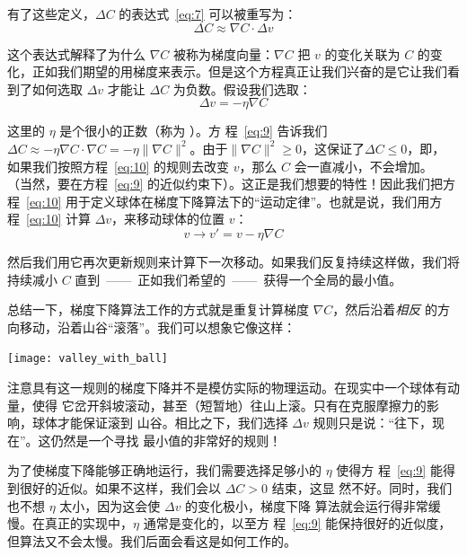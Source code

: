 有了这些定义，$\Delta C$ 的表达式~\eqref{eq:7} 可以被重写为：
\begin{equation}
  \Delta C \approx \nabla C \cdot \Delta v
  \label{eq:9}\tag{9}
\end{equation}

这个表达式解释了为什么 $\nabla C$ 被称为梯度向量：$\nabla C$ 把 $v$ 的变化关联为
$C$ 的变化，正如我们期望的用梯度来表示。但是这个方程真正让我们兴奋的是它让我们看
到了如何选取 $\Delta v$ 才能让 $\Delta C$ 为负数。假设我们选取：
\begin{equation}
  \Delta v = -\eta \nabla C
  \label{eq:10}\tag{10}
\end{equation}

这里的 $\eta$ 是个很小的正数（称为%
  \emph{\learningrate}\index{\learningrate}）。方
程~\eqref{eq:9} 告诉我们$\Delta C \approx -\eta \nabla C \cdot \nabla C = -\eta
\|\nabla C\|^2$。由于$\| \nabla C \|^2 \geq 0$，这保证了$\Delta C \leq 0$，即，
如果我们按照方程~\eqref{eq:10} 的规则去改变 $v$，那么 $C$ 会一直减小，不会增加。
（当然，要在方程~\eqref{eq:9} 的近似约束下）。这正是我们想要的特性！因此我们把方
程~\eqref{eq:10} 用于定义球体在梯度下降算法下的“运动定律”。也就是说，我们用方
程~\eqref{eq:10} 计算 $\Delta v$，来移动球体的位置 $v$：
\begin{equation}
  v \rightarrow v' = v -\eta \nabla C
  \label{eq:11}\tag{11}
\end{equation}

然后我们用它再次更新规则来计算下一次移动。如果我们反复持续这样做，我们将持续减小
$C$ 直到~——~正如我们希望的~——~获得一个全局的最小值。

总结一下，梯度下降算法工作的方式就是重复计算梯度 $\nabla C$，然后沿着\emph{相反}
的方向移动，沿着山谷“滚落”。我们可以想象它像这样：
\begin{center}
  \texttt{[image: valley\_with\_ball]}
\end{center}

注意具有这一规则的梯度下降并不是模仿实际的物理运动。在现实中一个球体有动量，使得
它岔开斜坡滚动，甚至（短暂地）往山上滚。只有在克服摩擦力的影响，球体才能保证滚到
山谷。相比之下，我们选择 $\Delta v$ 规则只是说：“往下，现在”。这仍然是一个寻找
最小值的非常好的规则！

为了使梯度下降能够正确地运行，我们需要选择足够小的\learningrate{} $\eta$ 使得方
程~\eqref{eq:9} 能得到很好的近似。如果不这样，我们会以 $\Delta C > 0$ 结束，这显
然不好。同时，我们也不想 $\eta$ 太小，因为这会使 $\Delta v$ 的变化极小，梯度下降
算法就会运行得非常缓慢。在真正的实现中，$\eta$ 通常是变化的，以至方
程~\eqref{eq:9} 能保持很好的近似度，但算法又不会太慢。我们后面会看这是如何工作的。

